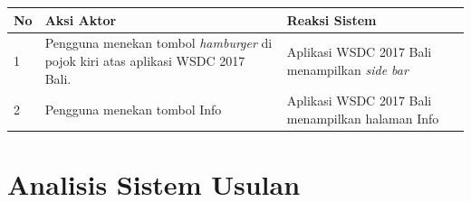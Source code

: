\begin{enumerate}
\begin{itemize}
\begin{table}[H]
\begin{tabular}{|p{0.5cm}|p{7cm}|p{7cm}|}
				\hline
				No & Aksi Aktor                               & Reaksi Sistem                                          \\ \hline
				1  & Pengguna menekan tombol {\it hamburger} di pojok kiri atas aplikasi WSDC 2017 Bali. & Aplikasi WSDC 2017 Bali menampilkan {\it side bar} \\ \hline
				2  & Pengguna menekan tombol Info & Aplikasi WSDC 2017 Bali menampilkan halaman Info \\ \hline
			\end{tabular}
		\end{table}
	\end{itemize}
\end{enumerate}

\section{Analisis Sistem Usulan}
\label{sec:analisisSistemUsulan}